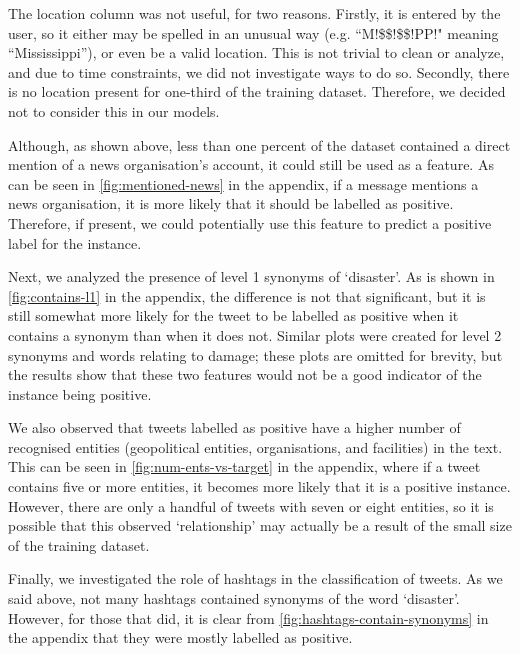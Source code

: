 The location column was not useful, for two reasons.
Firstly, it is entered by the user, so it either may be spelled in an unusual way (e.g.
``M!\$\$!\$\$!PP!" meaning ``Mississippi''), or even be a valid location.
This is not trivial to clean or analyze, and due to time constraints, we did not investigate ways to do so.
Secondly, there is no location present for one-third of the training dataset.
Therefore, we decided not to consider this in our models.

Although, as shown above, less than one percent of the dataset contained a direct mention of a news organisation's account, it could still be used as a feature.
As can be seen in \autoref{fig:mentioned-news} in the appendix, if a message mentions a news organisation, it is more likely that it should be labelled as positive.
Therefore, if present, we could potentially use this feature to predict a positive label for the instance.

Next, we analyzed the presence of level 1 synonyms of `disaster'.
As is shown in \autoref{fig:contains-l1} in the appendix, the difference is not that significant, but it is still somewhat more likely for the tweet to be labelled as positive when it contains a synonym than when it does not.
Similar plots were created for level 2 synonyms and words relating to damage; these plots are omitted for brevity, but the results show that these two features would not be a good indicator of the instance being positive.

We also observed that tweets labelled as positive have a higher number of recognised entities (geopolitical entities, organisations, and facilities) in the text.
This can be seen in \autoref{fig:num-ents-vs-target} in the appendix, where if a tweet contains five or more entities, it becomes more likely that it is a positive instance.
However, there are only a handful of tweets with seven or eight entities, so it is possible that this observed `relationship' may actually be a result of the small size of the training dataset.

Finally, we investigated the role of hashtags in the classification of tweets.
As we said above, not many hashtags contained synonyms of the word `disaster'.
However, for those that did, it is clear from \autoref{fig:hashtags-contain-synonyms} in the appendix that they were mostly labelled as positive.


